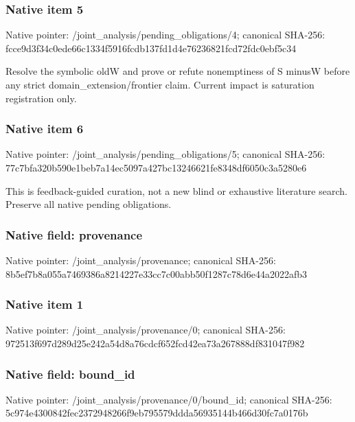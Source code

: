 \documentclass[10pt,a4paper]{article}
\begin{document}
\subsubsection{Native item 5}
Native pointer: /joint\_\allowbreak{}analysis/pending\_\allowbreak{}obligations/4; canonical SHA-256: fcce9d3f34c0ede66c1334f5916fcdb137fd1d4e76236821fcd72fdc0ebf5c34

\begingroup\raggedright\sloppy Resolve the symbolic oldW and prove or refute nonemptiness of S minusW before any strict domain\_\allowbreak{}extension/\allowbreak{}frontier claim. Current impact is saturation registration only.\par\endgroup

\subsubsection{Native item 6}
Native pointer: /joint\_\allowbreak{}analysis/pending\_\allowbreak{}obligations/5; canonical SHA-256: 77c7bfa320b590e1beb7a14ec5097a427bc13246621fe8348df6050c3a5280e6

\begingroup\raggedright\sloppy This is feedback-guided curation,\allowbreak{} not a new blind or exhaustive literature search. Preserve all native pending obligations.\par\endgroup

\subsubsection{Native field: provenance}
Native pointer: /joint\_\allowbreak{}analysis/provenance; canonical SHA-256: 8b5ef7b8a055a7469386a8214227e33cc7c00abb50f1287c78d6e44a2022afb3

\subsubsection{Native item 1}
Native pointer: /joint\_\allowbreak{}analysis/provenance/0; canonical SHA-256: 972513f697d289d25e242a54d8a76cdcf652fcd42ea73a267888df831047f982

\subsubsection{Native field: bound\_\allowbreak{}id}
Native pointer: /joint\_\allowbreak{}analysis/provenance/0/bound\_\allowbreak{}id; canonical SHA-256: 5c974e4300842fec2372948266f9eb795579ddda56935144b466d30fc7a0176b
\end{document}
